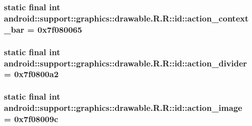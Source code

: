 \hypertarget{classandroid_1_1support_1_1graphics_1_1drawable_1_1_r_1_1id_80840d6df23ce9e9b97f4758454a9e46}{
\subsubsection[{action\_\-context\_\-bar}]{\setlength{\rightskip}{0pt plus 5cm}static final int android::support::graphics::drawable.R.R::id::action\_\-context\_\-bar = 0x7f080065}}
\label{classandroid_1_1support_1_1graphics_1_1drawable_1_1_r_1_1id_80840d6df23ce9e9b97f4758454a9e46}


\hypertarget{classandroid_1_1support_1_1graphics_1_1drawable_1_1_r_1_1id_6b5787d910b7f2bc5c32f782a6f3b8be}{
\subsubsection[{action\_\-divider}]{\setlength{\rightskip}{0pt plus 5cm}static final int android::support::graphics::drawable.R.R::id::action\_\-divider = 0x7f0800a2}}
\label{classandroid_1_1support_1_1graphics_1_1drawable_1_1_r_1_1id_6b5787d910b7f2bc5c32f782a6f3b8be}


\hypertarget{classandroid_1_1support_1_1graphics_1_1drawable_1_1_r_1_1id_383bdea623463ede7b9ba40c45c05297}{
\subsubsection[{action\_\-image}]{\setlength{\rightskip}{0pt plus 5cm}static final int android::support::graphics::drawable.R.R::id::action\_\-image = 0x7f08009c}}
\label{classandroid_1_1support_1_1graphics_1_1drawable_1_1_r_1_1id_383bdea623463ede7b9ba40c45c05297}



